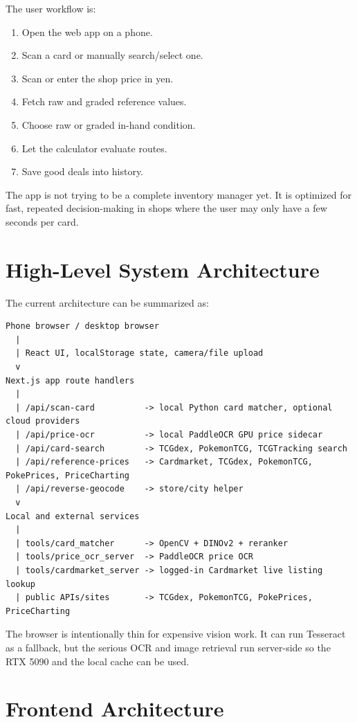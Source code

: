 \documentclass[11pt,a4paper]{article}
\begin{document}
The user workflow is:

\begin{enumerate}
  \item Open the web app on a phone.
  \item Scan a card or manually search/select one.
  \item Scan or enter the shop price in yen.
  \item Fetch raw and graded reference values.
  \item Choose raw or graded in-hand condition.
  \item Let the calculator evaluate routes.
  \item Save good deals into history.
\end{enumerate}

The app is not trying to be a complete inventory manager yet. It is optimized for fast, repeated decision-making in shops where the user may only have a few seconds per card.

\section{High-Level System Architecture}

The current architecture can be summarized as:

\begin{lstlisting}
Phone browser / desktop browser
  |
  | React UI, localStorage state, camera/file upload
  v
Next.js app route handlers
  |
  | /api/scan-card          -> local Python card matcher, optional cloud providers
  | /api/price-ocr          -> local PaddleOCR GPU price sidecar
  | /api/card-search        -> TCGdex, PokemonTCG, TCGTracking search
  | /api/reference-prices   -> Cardmarket, TCGdex, PokemonTCG, PokePrices, PriceCharting
  | /api/reverse-geocode    -> store/city helper
  v
Local and external services
  |
  | tools/card_matcher      -> OpenCV + DINOv2 + reranker
  | tools/price_ocr_server  -> PaddleOCR price OCR
  | tools/cardmarket_server -> logged-in Cardmarket live listing lookup
  | public APIs/sites       -> TCGdex, PokemonTCG, PokePrices, PriceCharting
\end{lstlisting}

The browser is intentionally thin for expensive vision work. It can run Tesseract as a fallback, but the serious OCR and image retrieval run server-side so the RTX 5090 and the local cache can be used.

\section{Frontend Architecture}
\end{document}
